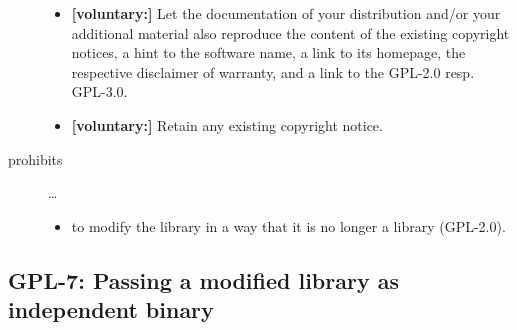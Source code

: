 \begin{description}
\begin{itemize}
  \item \textbf{[voluntary:]} Let the documentation of your distribution and/or
  your additional material also reproduce the content of the existing
  copyright notices, a hint to the software name, a link to its homepage,
  the respective disclaimer of warranty, and a link to the GPL-2.0 resp.
  GPL-3.0.
  
  \item \textbf{[voluntary:]} Retain any existing copyright notice. 

\end{itemize}

\item[prohibits] \ldots
\begin{itemize}
  \item to modify the library in a way that it is no longer a library
  (GPL-2.0).
\end{itemize}

\end{description}


\subsection{GPL-7: Passing a modified library as independent binary}

